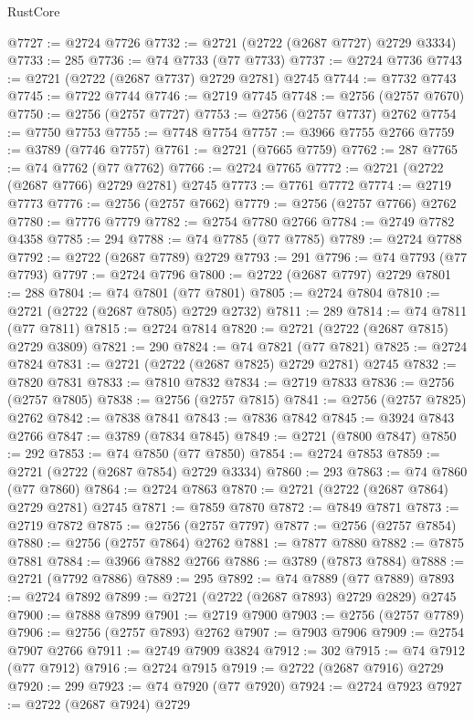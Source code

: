 \begin{lexlean}{RustCore}
\begin{coremodule}
@7727 := @2724 @7726
@7732 := @2721 (@2722 (@2687 @7727) @2729 @3334)
@7733 := 285
@7736 := @74 @7733 (@77 @7733)
@7737 := @2724 @7736
@7743 := @2721 (@2722 (@2687 @7737) @2729 @2781) @2745
@7744 := @7732 @7743
@7745 := @7722 @7744
@7746 := @2719 @7745
@7748 := @2756 (@2757 @7670)
@7750 := @2756 (@2757 @7727)
@7753 := @2756 (@2757 @7737) @2762
@7754 := @7750 @7753
@7755 := @7748 @7754
@7757 := @3966 @7755 @2766
@7759 := @3789 (@7746 @7757)
@7761 := @2721 (@7665 @7759)
@7762 := 287
@7765 := @74 @7762 (@77 @7762)
@7766 := @2724 @7765
@7772 := @2721 (@2722 (@2687 @7766) @2729 @2781) @2745
@7773 := @7761 @7772
@7774 := @2719 @7773
@7776 := @2756 (@2757 @7662)
@7779 := @2756 (@2757 @7766) @2762
@7780 := @7776 @7779
@7782 := @2754 @7780 @2766
@7784 := @2749 @7782 @4358
@7785 := 294
@7788 := @74 @7785 (@77 @7785)
@7789 := @2724 @7788
@7792 := @2722 (@2687 @7789) @2729
@7793 := 291
@7796 := @74 @7793 (@77 @7793)
@7797 := @2724 @7796
@7800 := @2722 (@2687 @7797) @2729
@7801 := 288
@7804 := @74 @7801 (@77 @7801)
@7805 := @2724 @7804
@7810 := @2721 (@2722 (@2687 @7805) @2729 @2732)
@7811 := 289
@7814 := @74 @7811 (@77 @7811)
@7815 := @2724 @7814
@7820 := @2721 (@2722 (@2687 @7815) @2729 @3809)
@7821 := 290
@7824 := @74 @7821 (@77 @7821)
@7825 := @2724 @7824
@7831 := @2721 (@2722 (@2687 @7825) @2729 @2781) @2745
@7832 := @7820 @7831
@7833 := @7810 @7832
@7834 := @2719 @7833
@7836 := @2756 (@2757 @7805)
@7838 := @2756 (@2757 @7815)
@7841 := @2756 (@2757 @7825) @2762
@7842 := @7838 @7841
@7843 := @7836 @7842
@7845 := @3924 @7843 @2766
@7847 := @3789 (@7834 @7845)
@7849 := @2721 (@7800 @7847)
@7850 := 292
@7853 := @74 @7850 (@77 @7850)
@7854 := @2724 @7853
@7859 := @2721 (@2722 (@2687 @7854) @2729 @3334)
@7860 := 293
@7863 := @74 @7860 (@77 @7860)
@7864 := @2724 @7863
@7870 := @2721 (@2722 (@2687 @7864) @2729 @2781) @2745
@7871 := @7859 @7870
@7872 := @7849 @7871
@7873 := @2719 @7872
@7875 := @2756 (@2757 @7797)
@7877 := @2756 (@2757 @7854)
@7880 := @2756 (@2757 @7864) @2762
@7881 := @7877 @7880
@7882 := @7875 @7881
@7884 := @3966 @7882 @2766
@7886 := @3789 (@7873 @7884)
@7888 := @2721 (@7792 @7886)
@7889 := 295
@7892 := @74 @7889 (@77 @7889)
@7893 := @2724 @7892
@7899 := @2721 (@2722 (@2687 @7893) @2729 @2829) @2745
@7900 := @7888 @7899
@7901 := @2719 @7900
@7903 := @2756 (@2757 @7789)
@7906 := @2756 (@2757 @7893) @2762
@7907 := @7903 @7906
@7909 := @2754 @7907 @2766
@7911 := @2749 @7909 @3824
@7912 := 302
@7915 := @74 @7912 (@77 @7912)
@7916 := @2724 @7915
@7919 := @2722 (@2687 @7916) @2729
@7920 := 299
@7923 := @74 @7920 (@77 @7920)
@7924 := @2724 @7923
@7927 := @2722 (@2687 @7924) @2729

\end{coremodule}
\end{lexlean}

